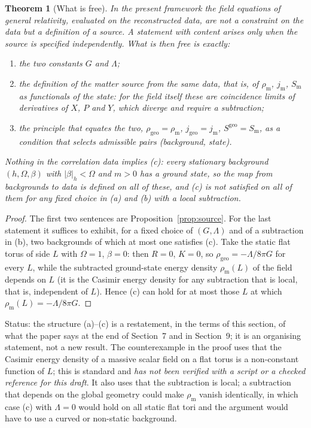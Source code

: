 \documentclass[a4paper,11pt]{article}
\newtheorem{theorem}{Theorem}[section]
\theoremstyle{definition}
\theoremstyle{remark}
\newcommand{\status}[1]{\par\noindent\textsf{\small Status: #1}\par}
\begin{document}
\begin{theorem}[What is free]\label{thm:free}
In the present framework the field equations of general relativity, evaluated on the reconstructed data, are not a constraint on the data but a definition of a source. A statement with content arises only when the source is specified independently. What is then free is exactly:
\begin{enumerate}[label=\textup{(\alph*)}]
\item the two constants $G$ and $\Lambda$;
\item the definition of the matter source from the same data, that is, of $\rho_{\mathrm m}$, $j_{\mathrm m}$, $S_{\mathrm m}$ as functionals of the state: for the field itself these are coincidence limits of derivatives of $X$, $P$ and $Y$, which diverge and require a subtraction;
\item the principle that equates the two, $\rho_{\mathrm{geo}}=\rho_{\mathrm m}$, $j_{\mathrm{geo}}=j_{\mathrm m}$, $S^{\mathrm{geo}}=S_{\mathrm m}$, as a condition that selects admissible pairs (background, state).
\end{enumerate}
Nothing in the correlation data implies \textup{(c)}: every stationary background $(h,\Omega,\beta)$ with $|\beta|_h<\Omega$ and $m>0$ has a ground state, so the map from backgrounds to data is defined on all of these, and \textup{(c)} is not satisfied on all of them for any fixed choice in \textup{(a)} and \textup{(b)} with a local subtraction.
\end{theorem}

\begin{proof}
The first two sentences are Proposition~\ref{prop:source}. For the last statement it suffices to exhibit, for a fixed choice of $(G,\Lambda)$ and of a subtraction in (b), two backgrounds of which at most one satisfies (c). Take the static flat torus of side $L$ with $\Omega=1$, $\beta=0$: then $R=0$, $K=0$, so $\rho_{\mathrm{geo}}=-\Lambda/8\pi G$ for every $L$, while the subtracted ground-state energy density $\rho_{\mathrm m}(L)$ of the field depends on $L$ (it is the Casimir energy density for any subtraction that is local, that is, independent of $L$). Hence (c) can hold for at most those $L$ at which $\rho_{\mathrm m}(L)=-\Lambda/8\pi G$.
\end{proof}
\status{the structure (a)--(c) is a restatement, in the terms of this section, of what the paper says at the end of Section~7 and in Section~9; it is an organising statement, not a new result. The counterexample in the proof uses that the Casimir energy density of a massive scalar field on a flat torus is a non-constant function of $L$; this is standard and \emph{has not been verified with a script or a checked reference for this draft}. It also uses that the subtraction is local; a subtraction that depends on the global geometry could make $\rho_{\mathrm m}$ vanish identically, in which case (c) with $\Lambda=0$ would hold on all static flat tori and the argument would have to use a curved or non-static background.}
\end{document}
